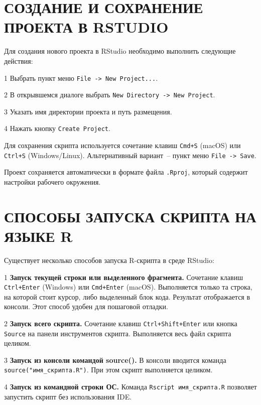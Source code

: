 \documentclass[14pt,a4paper]{extarticle}
\begin{document}
\newpage

\section{СОЗДАНИЕ И СОХРАНЕНИЕ ПРОЕКТА В RSTUDIO}

Для создания нового проекта в RStudio необходимо выполнить следующие действия:

1 Выбрать пункт меню \texttt{File -> New Project...}.

2 В открывшемся диалоге выбрать \texttt{New Directory -> New Project}.

3 Указать имя директории проекта и путь размещения.

4 Нажать кнопку \texttt{Create Project}.

Для сохранения скрипта используется сочетание клавиш \texttt{Cmd+S} (macOS) или \texttt{Ctrl+S} (Windows/Linux). Альтернативный вариант~-- пункт меню \texttt{File -> Save}.

Проект сохраняется автоматически в формате файла \texttt{.Rproj}, который содержит настройки рабочего окружения.

\newpage

\section{СПОСОБЫ ЗАПУСКА СКРИПТА НА ЯЗЫКЕ R}

Существует несколько способов запуска R-скрипта в среде RStudio:

1 \textbf{Запуск текущей строки или выделенного фрагмента.} Сочетание клавиш \texttt{Ctrl+Enter} (Windows) или \texttt{Cmd+Enter} (macOS). Выполняется только та строка, на которой стоит курсор, либо выделенный блок кода. Результат отображается в консоли. Этот способ удобен для пошаговой отладки.

2 \textbf{Запуск всего скрипта.} Сочетание клавиш \texttt{Ctrl+Shift+Enter} или кнопка \texttt{Source} на панели инструментов скрипта. Выполняется весь файл скрипта целиком.

3 \textbf{Запуск из консоли командой source().} В консоли вводится команда \texttt{source("имя\_скрипта.R")}. При этом скрипт выполняется целиком.

4 \textbf{Запуск из командной строки ОС.} Команда \texttt{Rscript имя\_скрипта.R} позволяет запустить скрипт без использования IDE.
\end{document}

